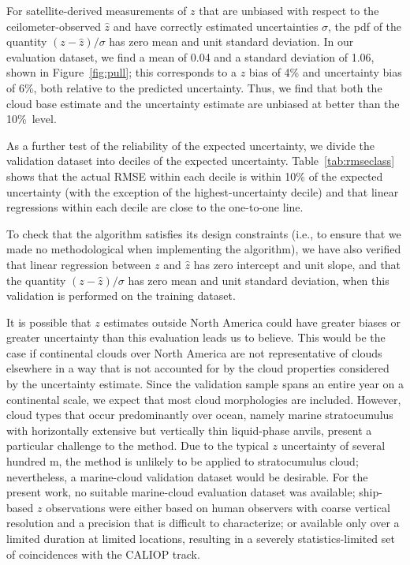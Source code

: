 \documentclass[essd,manuscript]{copernicus}\usepackage[]{graphicx}\usepackage[]{color}
\newcommand\CBH{\ensuremath{z}}
\begin{document}
For satellite-derived measurements of \CBH{} that are unbiased with respect
to the ceilometer-observed $\hat{\CBH}$ and have correctly estimated
uncertainties $\sigma$, the pdf of the quantity $(\CBH - \hat{z})/\sigma$ has zero
mean and unit standard deviation. In our evaluation dataset, we find a mean of
0.04 and a standard
deviation of 1.06, shown in
Figure~\ref{fig:pull}; this corresponds to a \CBH{} bias of %
4\% and
uncertainty bias of %
6\%,
both relative to the predicted uncertainty.  Thus, we find that both the cloud
base estimate and the uncertainty estimate are unbiased at better than the 10\%\
level.

As a further test of the reliability of the expected uncertainty, we divide the
validation dataset into deciles of the expected uncertainty.
Table~\ref{tab:rmseclass} shows that the actual RMSE within each decile is
within 10\% of the expected uncertainty (with the exception of the highest-uncertainty
decile) and that linear regressions within each
decile are close to the one-to-one line.

To check that the algorithm satisfies its design constraints (i.e., to ensure
that we made no methodological when implementing the algorithm), we have also
verified that linear regression between $z$ and $\hat{z}$ has zero intercept and
unit slope, and that the quantity $(z - \hat{z})/\sigma$ has zero mean and unit
standard deviation, when this validation is performed on the training dataset.

It is possible that \CBH{} estimates outside North America could have greater
biases or greater uncertainty than this evaluation leads us to believe.  This
would be the case if continental clouds over North America are not
representative of clouds elsewhere in a way that is not accounted for by the
cloud properties considered by the uncertainty estimate.  Since the validation
sample spans an entire year on a continental scale, we expect that most cloud
morphologies are included.
However, cloud types that occur predominantly over ocean, namely marine stratocumulus with
horizontally extensive but vertically thin liquid-phase anvils, 
present a particular challenge to the method.  Due to the
typical \CBH{} uncertainty of several hundred m, the method is unlikely to be
applied to stratocumulus cloud; nevertheless, a marine-cloud validation dataset
would be desirable.  For the present work, no suitable marine-cloud evaluation
dataset was available; ship-based \CBH{} observations were either based on human
observers with coarse vertical resolution and a precision that is difficult to
characterize; or available only over a limited duration at limited
locations, resulting in a severely statistics-limited set of coincidences with
the CALIOP track.
\end{document}
